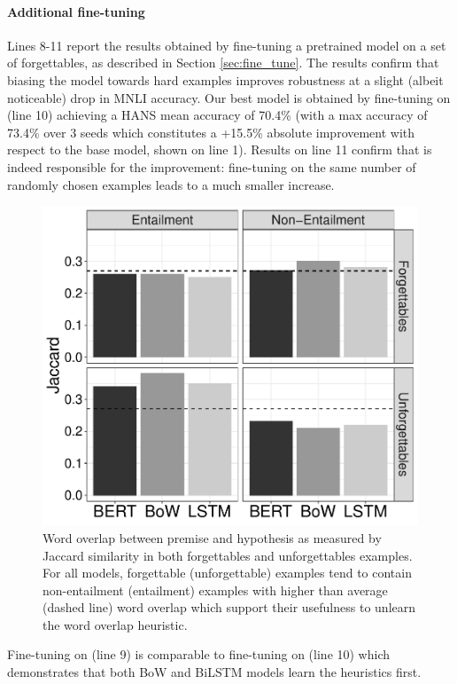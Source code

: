 \paragraph{Additional fine-tuning} Lines 8-11 report the results obtained by fine-tuning a pretrained model on a set of forgettables, as described in Section \ref{sec:fine_tune}. The results confirm that biasing the model towards hard examples improves robustness at a slight (albeit noticeable) drop in MNLI accuracy. 
Our best model is obtained by fine-tuning on \fbow (line 10) achieving a HANS mean accuracy of 70.4\% (with a max accuracy of 73.4\% over 3 seeds which constitutes a +15.5\% absolute improvement with respect to the base model, shown on line 1). Results on line 11 confirm that \fbow is indeed responsible for the improvement: fine-tuning on the same number of randomly chosen examples leads to a much smaller increase.
\begin{figure}[t]
\centering
  \includegraphics[scale=0.40]{figures/jaccard_by_entailment.pdf}
  \caption{Word overlap between premise and hypothesis as measured by Jaccard similarity in both forgettables and unforgettables examples. For all models, forgettable (unforgettable) examples tend to contain non-entailment (entailment) examples with higher than average (dashed line) word overlap which support their usefulness to unlearn the word overlap heuristic.}
\label{fig:wordoverlap-unforg}
\end{figure}
Fine-tuning on \flstm (line 9) is comparable to fine-tuning on \fbow (line 10) which demonstrates that both BoW and BiLSTM models learn the heuristics first.
